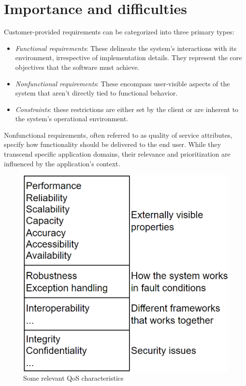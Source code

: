 \section{Importance and difficulties}

Customer-provided requirements can be categorized into three primary types:
\begin{itemize}
    \item \textit{Functional requirements}: These delineate the system's interactions with its environment, irrespective of implementation details. 
        They represent the core objectives that the software must achieve.
    \item \textit{Nonfunctional requirements}: These encompass user-visible aspects of the system that aren't directly tied to functional behavior.
    \item \textit{Constraints}: these restrictions are either set by the client or are inherent to the system's operational environment.
\end{itemize}
Nonfunctional requirements, often referred to as quality of service attributes, specify how functionality should be delivered to the end user. 
While they transcend specific application domains, their relevance and prioritization are influenced by the application's context.
\begin{figure}[H]
    \centering
    \includegraphics[width=0.35\linewidth]{images/QoS.png}
    \caption{Some relevant QoS characteristics}
\end{figure}
